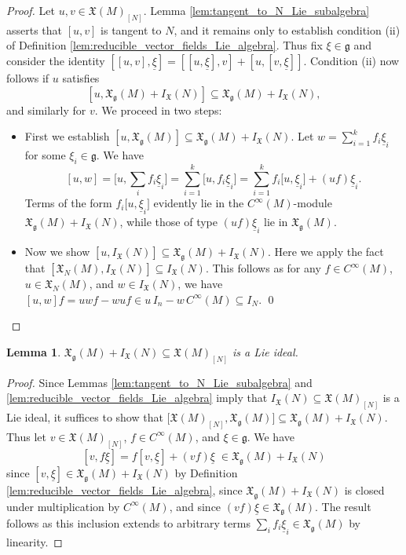 \documentclass[10pt,a4paper]{amsart}
\numberwithin{equation}{section}
\newtheorem{Lemma}[Theorem]{Lemma}
\newcommand{\g}{\mathfrak{g}}
\newcommand{\fgmodule}{\mathfrak{X}_{\g}}
\newcommand{\tgtvf}{\mathfrak X_N(M)}
\newcommand{\vanvf}{I_{\mathfrak{X}}(N)}%
\newcommand{\X}{\mathfrak{X}}
\renewcommand{\subset}{\subseteq}
\begin{document}
\begin{proof}
	Let $u,v\in\X(M)_{[N]}$. Lemma \ref{lem:tangent_to_N_Lie_subalgebra} asserts that $[u,v]$ is tangent to $N$, and it remains only to establish condition (ii) of Definition \ref{lem:reducible_vector_fields_Lie_algebra}. Thus fix $\xi\in\g$ and consider the identity $[[u,v],\underline\xi] = [[u,\underline\xi],v] + [u,[v,\underline\xi]]$.
 Condition (ii) now follows if $u$ satisfies
	\[
		[u, \fgmodule(M)+\vanvf]\subset  \fgmodule(M)+\vanvf,
	\]
	and similarly for $v$. We proceed in two steps:
	\begin{itemize}\itemsep=0pt
		\item First we establish $[u, \fgmodule(M)]\subset  \fgmodule(M)+\vanvf$. Let $w=\sum_{i=1}^k f_i \underline \xi_i$ for some $\xi_i\in\g$. We have
		\[
			[u, w]	= \bigl[u, {\textstyle\sum_i} f_i \underline \xi_i\bigr]
				= \sum_{i=1}^k \bigl[u, f_i\underline\xi_i\bigr]
				= \sum_{i=1}^k f_i\bigl[u,{\underline\xi}_i\bigr]+(uf)\underline\xi_i.
		\]
		Terms of the form $f_i\bigl[u,{\underline\xi}_i\bigr]$ evidently lie in the $C^\infty(M)$-module $\fgmodule(M)+\vanvf$, while those of type $(uf)\underline\xi_i$ lie in $\fgmodule(M)$.

	\item Now we show $[u, \vanvf]\subset  \fgmodule(M)+\vanvf$. Here we apply the fact that $[\tgtvf,\vanvf]\subset \vanvf$. This follows as for any $f\in C^\infty(M)$, $u\in \tgtvf$, and $w\in \vanvf$, we have $[u,w]f=uwf-wuf\in u\,I_n-w\,C^\infty(M)\subset I_N$.
\hfill\qed
\end{itemize}
\renewcommand{\qed}{}
\end{proof}

\begin{Lemma}\label{lem:Xg+I_X_is_a_Lie_ideal}
	$\X_\g(M)+I_\X(N)\subset\X(M)_{[N]}$ is a Lie ideal.
\end{Lemma}

\begin{proof}
	Since Lemmas \ref{lem:tangent_to_N_Lie_subalgebra} and \ref{lem:reducible_vector_fields_Lie_algebra} imply that $I_\X(N)\subset\X(M)_{[N]}$ is a Lie ideal, it suffices to show that $\bigl[\X(M)_{[N]},\X_\g(M)\bigr]\subset \X_\g(M)+I_\X(N)$. Thus let $v\in\X(M)_{[N]}$, $f\in C^\infty(M)$, and $\xi\in\g$. We have
	\[
		[v,f\underline\xi] = f[v,\underline\xi] + (vf)\underline\xi \;\in \X_\g(M) + I_\X(N)
	\]
	since $[v,\underline\xi]\in\X_\g(M)+I_\X(N)$ by Definition \ref{lem:reducible_vector_fields_Lie_algebra}, since $\X_\g(M)+I_\X(N)$ is closed under multiplication by $C^\infty(M)$, and since $(vf)\underline\xi\in\X_\g(M)$. The result follows as this inclusion extends to arbitrary terms $\sum_if_i\underline\xi_i\in\X_\g(M)$ by linearity.
\end{proof}
\end{document}
